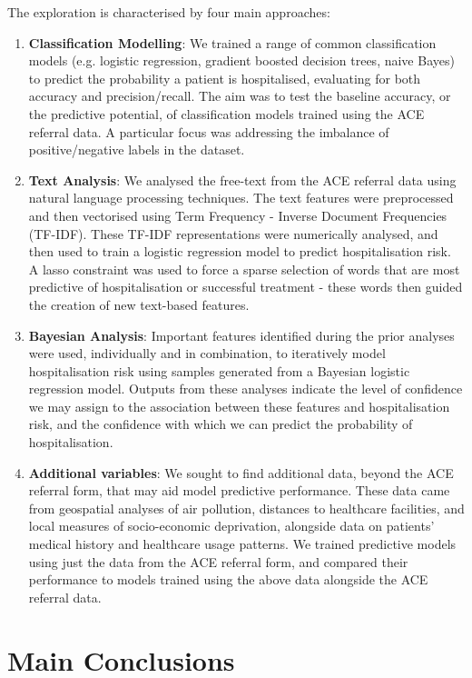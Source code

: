 The exploration is characterised by four main approaches:
\begin{enumerate}
    \item \textbf{Classification Modelling}: We trained a range of common classification models (e.g. logistic regression, gradient boosted decision trees, naive Bayes) to predict the probability a patient is hospitalised, evaluating for both accuracy and precision/recall. The aim was to test the baseline accuracy, or the predictive potential, of classification models trained using the ACE referral data. A particular focus was addressing the imbalance of positive/negative labels in the dataset.
    \item \textbf{Text Analysis}: We analysed the free-text from the ACE referral data using natural language processing techniques.
    The text features were preprocessed and then vectorised using Term Frequency - Inverse Document Frequencies (TF-IDF). These TF-IDF representations were numerically analysed, and then used to train a logistic regression model to predict hospitalisation risk. A lasso constraint was used to force a sparse selection of words that are most predictive of hospitalisation or successful treatment - these words then guided the creation of new text-based features.
    \item \textbf{Bayesian Analysis}: Important features identified during the prior analyses were used, individually and in combination, to iteratively model hospitalisation risk using samples generated from a Bayesian logistic regression model.
    Outputs from these analyses indicate the level of confidence we may assign to the association between these features and hospitalisation risk, and the confidence with which we can predict the probability of hospitalisation.
    
    \item \textbf{Additional variables}: We sought to find additional data, beyond the ACE referral form, that may aid model predictive performance. These data came from geospatial analyses of air pollution, distances to healthcare facilities, and local measures of socio-economic deprivation, alongside data on patients' medical history and healthcare usage patterns. We trained predictive models using just the data from the ACE referral form, and compared their performance to models trained using the above data alongside the ACE referral data.
\end{enumerate}

\section*{Main Conclusions}\label{sec:main-conclusions}

